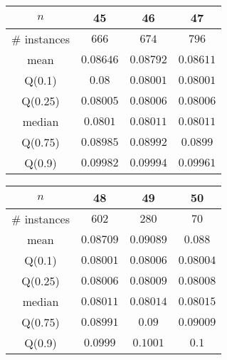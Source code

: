 \begin{tabular}{c|ccc} 
\hline 
$n$ & 45 & 46 & 47 \tabularnewline 
\hline 
\hline 
\# instances & $666$ & $674$ & $796$ \tabularnewline 
mean & $0.08646$ & $0.08792$ & $0.08611$ \tabularnewline 
Q(0.1) & $0.08$ & $0.08001$ & $0.08001$ \tabularnewline 
Q(0.25) & $0.08005$ & $0.08006$ & $0.08006$ \tabularnewline 
median & $0.0801$ & $0.08011$ & $0.08011$ \tabularnewline 
Q(0.75) & $0.08985$ & $0.08992$ & $0.0899$ \tabularnewline 
Q(0.9) & $0.09982$ & $0.09994$ & $0.09961$ \tabularnewline 
\hline 
\end{tabular} 
\medskip{} 

\begin{tabular}{c|ccc} 
\hline 
$n$ & 48 & 49 & 50 \tabularnewline 
\hline 
\hline 
\# instances & $602$ & $280$ & $70$ \tabularnewline 
mean & $0.08709$ & $0.09089$ & $0.088$ \tabularnewline 
Q(0.1) & $0.08001$ & $0.08006$ & $0.08004$ \tabularnewline 
Q(0.25) & $0.08006$ & $0.08009$ & $0.08008$ \tabularnewline 
median & $0.08011$ & $0.08014$ & $0.08015$ \tabularnewline 
Q(0.75) & $0.08991$ & $0.09$ & $0.09009$ \tabularnewline 
Q(0.9) & $0.0999$ & $0.1001$ & $0.1$ \tabularnewline 
\hline 
\end{tabular} 
\medskip{} 


